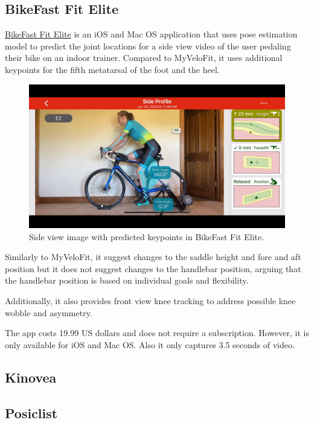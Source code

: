 \subsection{BikeFast Fit Elite}
\href{https://www.bikefastfit.com/}{BikeFast Fit Elite} is an iOS and Mac OS application that uses pose estimation model to predict the joint locations for a side view video of the user pedaling their bike on an indoor trainer. Compared to MyVeloFit, it uses additional keypoints for the fifth metatarsal of the foot and the heel.

\begin{figure}[htbp]
    \centering
    \includegraphics[width=\textwidth]{obrazky-figures/bike_fast_fit_elite.png}
    \caption{Side view image with predicted keypoints in BikeFast Fit Elite.}
    \label{fig:bikefastfit_keypoints}
\end{figure}

Similarly to MyVeloFit, it suggest changes to the saddle height and fore and aft position but it does not suggest changes to the handlebar position, arguing that the handlebar position is based on individual goals and flexibility.

Additionally, it also provides front view knee tracking to address possible knee wobble and asymmetry.

The app costs 19.99 US dollars and does not require a subscription. However, it is only available for iOS and Mac OS. Also it only captures 3.5 seconds of video.


\subsection{Kinovea}


\subsection{Posiclist}



